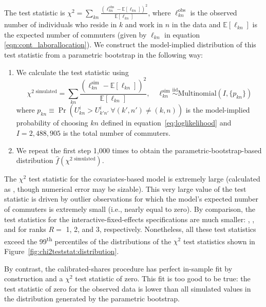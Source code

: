 \documentclass[11pt]{article}
\theoremstyle{definition}
\begin{document}
The test statistic is $\chi^2= \sum_{kn}\frac{(\ell_{kn}^{\text{obs}}- \mathbb{E}[\ell_{kn}])^2}{\mathbb{E}[\ell_{kn}]}$,
where $\ell_{kn}^{\text{obs}}$ is the observed number of individuals who reside in $k$ and work in $n$ in the data
and $\mathbb{E}[\ell_{kn}]$ is the expected number of commuters (given by $\ell_{kn}$ in equation \eqref{eqn:cont_laborallocation}).
We construct the model-implied distribution of this test statistic from a parametric bootstrap in the following way:
\begin{enumerate}
    \item We calculate the test statistic using 
    $$ 
    \chi^{2 \text{ simulated}}  = \sum_{kn}\frac{(\ell_{kn}^{\text{sim}}- \mathbb{E}[\ell_{kn}])^2}{\mathbb{E}[\ell_{kn}]}, \quad \ell_{kn}^{\text{sim}} \stackrel{\text{iid}}{\sim} \text{Multinomial}(I, \{p_{kn}\})
    $$
     where $p_{kn} \equiv \Pr(U_{kn}^{i} > U_{k'n'}^{i} \ \forall (k',n') \neq (k,n))$ is the model-implied probability of choosing $kn$ defined in equation~\eqref{eq:loglikelihood}
     and $I = 2,488,905 $ is the total number of commuters.
    \item We repeat the first step 1,000 times to obtain the parametric-bootstrap-based distribution $\hat{f}\left(\chi^{2 \text{ simulated}}\right)$.
\end{enumerate}

The $\chi^2$ test statistic for the covariates-based model is extremely large
(calculated as \unskip, though numerical error may be sizable). 
This very large value of the test statistic is driven by outlier observations for which the model's expected number of commuters is extremely small (i.e., nearly equal to zero).
By comparison, the test statistics for the interactive-fixed-effects specifications are much smaller:
\unskip,
\unskip,
and 
for ranks $R=$ 1, 2, and 3, respectively.
Nonetheless, all these test statistics exceed the 99\textsuperscript{th} percentiles of the distributions of the $\chi^{2}$ test statistics shown in Figure~\ref{fig:chi2teststat:distribution}.

By contrast, the calibrated-shares procedure has perfect in-sample fit by construction and a $\chi^2$ test statistic of zero.
This fit is too good to be true:
the test statistic of zero for the observed data is lower than all simulated values in the distribution generated by the parametric bootstrap.
\end{document}
